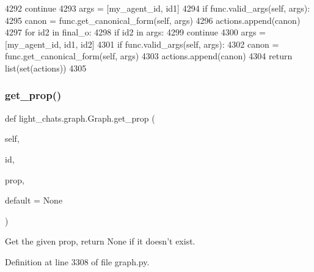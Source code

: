 \begin{DoxyCode}
4292                     \textcolor{keywordflow}{continue}
4293                 args = [my\_agent\_id, id1]
4294                 \textcolor{keywordflow}{if} func.valid\_args(self, args):
4295                     canon = func.get\_canonical\_form(self, args)
4296                     actions.append(canon)
4297                 \textcolor{keywordflow}{for} id2 \textcolor{keywordflow}{in} final\_o:
4298                     \textcolor{keywordflow}{if} id2 \textcolor{keywordflow}{in} args:
4299                         \textcolor{keywordflow}{continue}
4300                     args = [my\_agent\_id, id1, id2]
4301                     \textcolor{keywordflow}{if} func.valid\_args(self, args):
4302                         canon = func.get\_canonical\_form(self, args)
4303                         actions.append(canon)
4304         \textcolor{keywordflow}{return} list(set(actions))
4305 
\end{DoxyCode}
\mbox{\label{classlight__chats_1_1graph_1_1Graph_a30483d3bbb88924bb7b98fb72b2e23fe}} 
\subsubsection{\texorpdfstring{get\+\_\+prop()}{get\_prop()}}
{\footnotesize\ttfamily def light\+\_\+chats.\+graph.\+Graph.\+get\+\_\+prop (\begin{DoxyParamCaption}\item[{}]{self,  }\item[{}]{id,  }\item[{}]{prop,  }\item[{}]{default = {\ttfamily None} }\end{DoxyParamCaption})}

\begin{DoxyVerb}Get the given prop, return None if it doesn't exist.
\end{DoxyVerb}
 

Definition at line 3308 of file graph.\+py.


